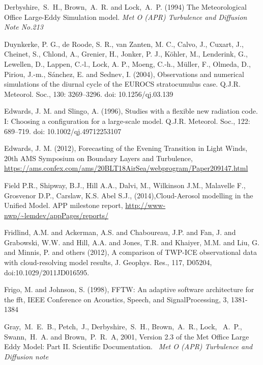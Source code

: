 \documentclass[a4paper,11pt]{article}
\begin{document}
\begin{thebibliography}{}
\item{Derbyshire,~S.~H., Brown,~A.~R. and Lock,~A.~P. (1994) The
  Meteorological Office Large-Eddy Simulation model. {\em Met O (APR)
    Turbulence and Diffusion Note No.213}}

\item{Duynkerke, P. G., de Roode, S. R., van Zanten, M. C., Calvo, J., Cuxart, J., Cheinet, S., Chlond, A., Grenier, H.,
    Jonker, P. J., Köhler, M., Lenderink, G., Lewellen, D., Lappen, C.-l., Lock, A. P., Moeng, C.-h., Müller, F.,
    Olmeda, D., Piriou, J.-m., Sánchez, E. and Sednev, I. (2004),
    Observations and numerical simulations of the diurnal cycle of the EUROCS stratocumulus case.
    Q.J.R. Meteorol. Soc., 130: 3269–3296. doi: 10.1256/qj.03.139}

\item{Edwards, J. M. and Slingo, A. (1996), Studies with a flexible new radiation code. I: Choosing a configuration for a large-scale model. Q.J.R. Meteorol. Soc., 122: 689–719. doi: 10.1002/qj.49712253107}

\item{Edwards, J. M. (2012), Forecasting of the Evening Transition in Light Winds, 20th AMS Symposium on Boundary Layers and Turbulence, \url{https://ams.confex.com/ams/20BLT18AirSea/webprogram/Paper209147.html}}

\item{Field P.R., Shipway, B.J., Hill A.A., Dalvi, M., Wilkinson J.M., Malavelle F., Grosvenor D.P., Carslaw, K.S. Abel S.J., (2014),Cloud-Aerosol modelling in the Unified Model. APP milestone report, \url{http://www-nwp/~lemdev/appPages/reports/}}

\item{Fridlind, A.M. and Ackerman, A.S. and Chaboureau, J.P. and Fan, J. and Grabowski, W.W. and Hill, A.A. and Jones, T.R. and Khaiyer, M.M. and Liu, G. and Minnis, P. and others (2012), A comparison of TWP-ICE observational data with cloud-resolving model results, J. Geophys. Res., 117, D05204, doi:10.1029/2011JD016595.}

\item{Frigo, M. and Johnson, S. (1998), FFTW: An adaptive software architecture for the fft, IEEE Conference on Acoustics, Speech, and SignalProcessing, 3, 1381-1384}

\item {Gray,~M.~E.~B., Petch,~J.,  Derbyshire,~S.~H., Brown,~A.~R., Lock, ~A.~P., Swann,~H.~A. and Brown,~P.~R.~A}, {2001}, {Version 2.3 of the Met Office Large Eddy Model: Part II. Scientific Documentation.} \ {\em Met O (APR) Turbulence and Diffusion note}


\end{thebibliography}
\end{document}
